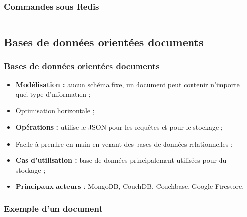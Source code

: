     \begin{frame}
        \frametitle{Commandes sous Redis}

        \begin{listing}[H]
            \inputminted[fontsize=\tiny, linenos=true]{text}{code/commandesRedis.txt}
            \caption{Quelques commandes Redis en console.}
        \end{listing}
    \end{frame}

    \subsection{Bases de données orientées documents}
    \begin{frame}
        \frametitle{Bases de données orientées documents}

        \begin{itemize}
            \item \textbf{Modélisation :} aucun schéma fixe, un document peut contenir n'importe quel type d'information ;
            \item Optimisation horizontale ;
            \item \textbf{Opérations :} utilise le JSON pour les requêtes et pour le stockage ;
            \item Facile à prendre en main en venant des bases de données relationnelles ;
            \item \textbf{Cas d'utilisation :} base de données principalement utilisées pour du stockage ;
            \item \textbf{Principaux acteurs :} MongoDB, CouchDB, Couchbase, Google Firestore.
        \end{itemize}
    \end{frame}

    \begin{frame}
        \frametitle{Exemple d'un document}

        \begin{listing}[H]
            \inputminted[fontsize=\tiny, linenos=true]{json}{code/exemple-document.json}
            \caption{Exemple d'un document JSON.}
        \end{listing}
    \end{frame}



